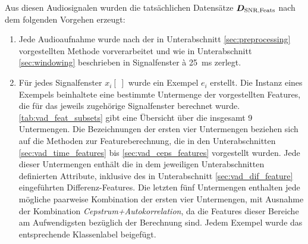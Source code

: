 Aus diesen Audiosignalen wurden die tatsächlichen Datensätze $\boldmath{D_{\text{SNR,Feats}}}$ nach dem folgenden Vorgehen erzeugt:
\begin{enumerate}
\item Jede Audioaufnahme wurde nach der in Unterabschnitt \ref{sec:preprocessing} vorgestellten Methode vorverarbeitet und wie in Unterabschnitt \ref{sec:windowing} beschrieben in Signalfenster \`{a} \SI{25}{\milli\second} zerlegt.
\item Für jedes Signalfenster $x_i[\;]$ wurde ein Exempel $e_i$ erstellt. Die Instanz eines Exempels beinhaltete eine bestimmte Untermenge der vorgestellten Features, die für das jeweils zugehörige Signalfenster berechnet wurde. \autoref{tab:vad_feat_subsets} gibt eine Übersicht über die insgesamt 9 Untermengen. Die Bezeichnungen der ersten vier Untermengen beziehen sich auf die Methoden zur Featureberechnung, die in den Unterabschnitten \ref{sec:vad_time_features} bis \ref{sec:vad_ceps_features} vorgestellt wurden. Jede dieser Untermengen enthält die in dem jeweiligen Unterabschnitten definierten Attribute, inklusive des in Unterabschnitt \ref{sec:vad_dif_feature} eingeführten Differenz-Features. Die letzten fünf Untermengen enthalten jede mögliche paarweise Kombination der ersten vier Untermengen, mit Ausnahme der Kombination \emph{Cepstrum+Autokorrelation}, da die Features dieser Bereiche am Aufwendigsten bezüglich der Berechnung sind. Jedem Exempel wurde das entsprechende Klassenlabel beigefügt.


\end{enumerate}
